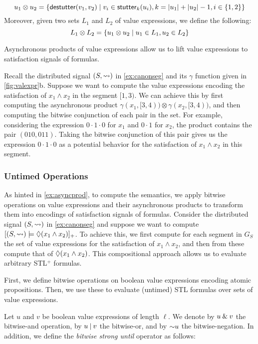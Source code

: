 \small
\[ u_1 \otimes u_2 = \{ \destutter(v_1, v_2) \st v_i \in \stutter_k(u_i), k = |u_1| + |u_2| - 1, i \in \{1,2\} \} \]  
\normalsize
Moreover, given two sets $L_1$ and $L_2$ of value expressions, we define the following: 
\small
\[ L_1 \otimes L_2 = \{ u_1 \otimes u_2 \st u_1 \in L_1, u_2 \in L_2 \} \]  
\normalsize

Asynchronous products of value expressions allow us to lift value expressions to satisfaction signals of formulas.

\begin{example} \label{ex:asyncprod}
	Recall the distributed signal $(S, {\rightsquigarrow})$ in \cref{ex:canonseg} and its $\gamma$ function given in \cref{fig:valexpr}b.
	Suppose we want to compute the value expressions encoding the satisfaction of $x_1 \land x_2$ in the segment $[1,3)$.
	We can achieve this by first computing the asynchronous product $\gamma(x_1, [3,4)) \otimes \gamma(x_2, [3,4))$, and then computing the bitwise conjunction of each pair in the set.
	For example, considering the expression $0 \cdot 1 \cdot 0$ for $x_1$ and $0 \cdot 1$ for $x_2$, the product contains the pair $(010, 011)$.
	Taking the bitwise conjunction of this pair gives us the expression $0 \cdot 1 \cdot 0$ as a potential behavior for the satisfaction of $x_1 \land x_2$ in this segment.
\end{example}

\subsubsection{Untimed Operations}
As hinted in \cref{ex:asyncprod}, to compute the semantics, we apply bitwise operations on value expressions and their asynchronous products to transform them into encodings of satisfaction signals of formulas.
Consider the distributed signal $(S, {\rightsquigarrow})$ in \cref{ex:canonseg} and suppose we want to compute $[(S, {\rightsquigarrow}) \models \lozenge (x_1 \land x_2)]_+$.
To achieve this, we first compute for each segment in $G_S$ the set of value expressions for the satisfaction of $x_1 \land x_2$, and then from these compute that of $\lozenge (x_1 \land x_2)$.
This compositional approach allows us to evaluate arbitrary STL$^+$ formulas.

First, we define bitwise operations on boolean value expressions encoding atomic propositions.
Then, we use these to evaluate (untimed) STL formulas over sets of value expressions.

Let $u$ and $v$ be boolean value expressions of length $\ell$.
We denote by $u \mathbin{\&} v$ the bitwise-and operation, by $u \mathbin{|} v$ the bitwise-or, and by $\mathord{\sim} u$ the bitwise-negation.
In addition, we define the \emph{bitwise strong until} operator as follows:

